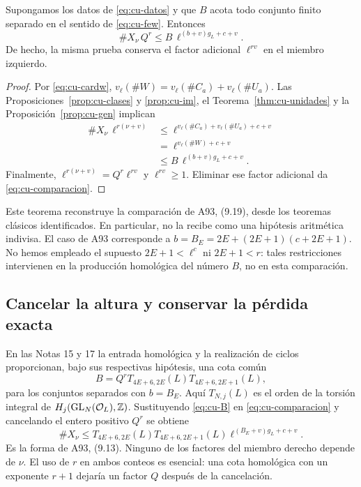 \begin{teorema}
\label{thm:cu-comparacion}
Supongamos los datos de \eqref{eq:cu-datos} y que $B$ acota todo conjunto finito separado en el sentido de \eqref{eq:cu-few}. Entonces
\begin{equation}
 \#X_\nu\,Q^r\le
 B\,\ell^{(b+v)g_L+c+v}.
 \label{eq:cu-comparacion}
\end{equation}
De hecho, la misma prueba conserva el factor adicional $\ell^{rv}$ en el miembro izquierdo.
\end{teorema}
\begin{proof}
Por \eqref{eq:cu-cardw}, $v_\ell(\#W)=v_\ell(\#C_a)+v_\ell(\#U_a)$. Las Proposiciones~\ref{prop:cu-clases} y \ref{prop:cu-im}, el Teorema~\ref{thm:cu-unidades} y la Proposición~\ref{prop:cu-gen} implican
\begin{align*}
 \#X_\nu\,\ell^{r(\nu+v)}
 &\le \ell^{v_\ell(\#C_a)+v_\ell(\#U_a)+c+v}\\
 &=\ell^{v_\ell(\#W)+c+v}\\
 &\le B\,\ell^{(b+v)g_L+c+v}.
\end{align*}
Finalmente, $\ell^{r(\nu+v)}=Q^r\ell^{rv}$ y $\ell^{rv}\ge1$. Eliminar ese factor adicional da \eqref{eq:cu-comparacion}.
\end{proof}

Este teorema reconstruye la comparación de A93, (9.19), desde los teoremas clásicos identificados. En particular, no la recibe como una hipótesis aritmética indivisa. El caso de A93 corresponde a $b=B_E=2E+(2E+1)(c+2E+1)$. No hemos empleado el supuesto $2E+1<\ell^c$ ni $2E+1<r$: tales restricciones intervienen en la producción homológica del número $B$, no en esta comparación.

\subsection{Cancelar la altura y conservar la pérdida exacta}

En las Notas 15 y 17 la entrada homológica y la realización de ciclos proporcionan, bajo sus respectivas hipótesis, una cota común
\begin{equation}
 B=Q^r T_{4E+6,2E}(L)T_{4E+6,2E+1}(L),
 \label{eq:cu-B}
\end{equation}
para los conjuntos separados con $b=B_E$. Aquí $T_{N,j}(L)$ es el orden de la torsión integral de $H_j(\operatorname{GL}_N(\mathcal O_L),\mathbb{Z})$. Sustituyendo \eqref{eq:cu-B} en \eqref{eq:cu-comparacion} y cancelando el entero positivo $Q^r$ se obtiene
\begin{equation}
 \#X_\nu\le T_{4E+6,2E}(L)T_{4E+6,2E+1}(L)
 \ell^{(B_E+v)g_L+c+v}.
 \label{eq:cu-final}
\end{equation}
Es la forma de A93, (9.13). Ninguno de los factores del miembro derecho depende de $\nu$. El uso de $r$ en ambos conteos es esencial: una cota homológica con un exponente $r+1$ dejaría un factor $Q$ después de la cancelación.

